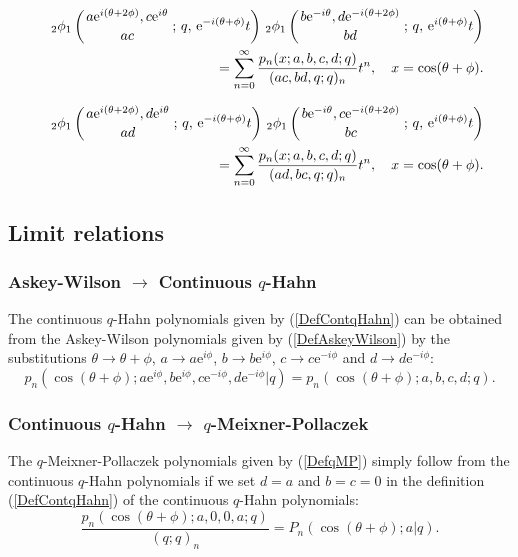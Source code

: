 \documentclass[envcountchap,graybox]{svmono}
\newcounter{rom}
\newcommand{\qhyp}[5]{\mbox{}_{#1}{\phi}_{#2}
\left(\genfrac{}{}{0pt}{}{#3}{#4}\,;\,q,\,#5\right)}
\newcommand{\e}{\textrm{e}}
\newcommand{\qhyp}[5]{\,\mbox{}_{#1}\phi_{#2}\!\left(
  \genfrac{}{}{0pt}{}{#3}{#4};#5\right)}
\begin{document}
\begin{eqnarray}
\label{GenContqHahn2}
& &\qhyp{2}{1}{a\e^{i(\theta+2\phi)},c\e^{i\theta}}{ac}{\e^{-i(\theta+\phi)}t}\,
\qhyp{2}{1}{b\e^{-i\theta},d\e^{-i(\theta+2\phi)}}{bd}{\e^{i(\theta+\phi)}t}\nonumber\\
& &{}=\sum_{n=0}^{\infty}\frac{p_n(x;a,b,c,d;q)}{(ac,bd,q;q)_n}t^n,\quad x=\cos(\theta+\phi).
\end{eqnarray}

\begin{eqnarray}
\label{GenContqHahn3}
& &\qhyp{2}{1}{a\e^{i(\theta+2\phi)},d\e^{i\theta}}{ad}{\e^{-i(\theta+\phi)}t}\,
\qhyp{2}{1}{b\e^{-i\theta},c\e^{-i(\theta+2\phi)}}{bc}{\e^{i(\theta+\phi)}t}\nonumber\\
& &{}=\sum_{n=0}^{\infty}\frac{p_n(x;a,b,c,d;q)}{(ad,bc,q;q)_n}t^n,\quad x=\cos(\theta+\phi).
\end{eqnarray}

\subsection*{Limit relations}

\subsubsection*{Askey-Wilson $\rightarrow$ Continuous $q$-Hahn}
The continuous $q$-Hahn polynomials given by (\ref{DefContqHahn}) can be obtained
from the Askey-Wilson polynomials given by (\ref{DefAskeyWilson}) by the substitutions
$\theta\rightarrow\theta+\phi$, $a\rightarrow a\e^{i\phi}$, $b\rightarrow b\e^{i\phi}$,
$c\rightarrow c\e^{-i\phi}$ and $d\rightarrow d\e^{-i\phi}$:
$$p_n(\cos(\theta+\phi);a\e^{i\phi},b\e^{i\phi},c\e^{-i\phi},d\e^{-i\phi}|q)=p_n(\cos(\theta+\phi);a,b,c,d;q).$$

\subsubsection*{Continuous $q$-Hahn $\rightarrow$ $q$-Meixner-Pollaczek}
The $q$-Meixner-Pollaczek polynomials given by (\ref{DefqMP}) simply follow
from the continuous $q$-Hahn polynomials if we set $d=a$ and $b=c=0$ in the
definition (\ref{DefContqHahn}) of the continuous $q$-Hahn polynomials:
\begin{equation}
\frac{p_n(\cos(\theta+\phi);a,0,0,a;q)}{(q;q)_n}=P_n(\cos(\theta+\phi);a|q).
\end{equation}
\end{document}
